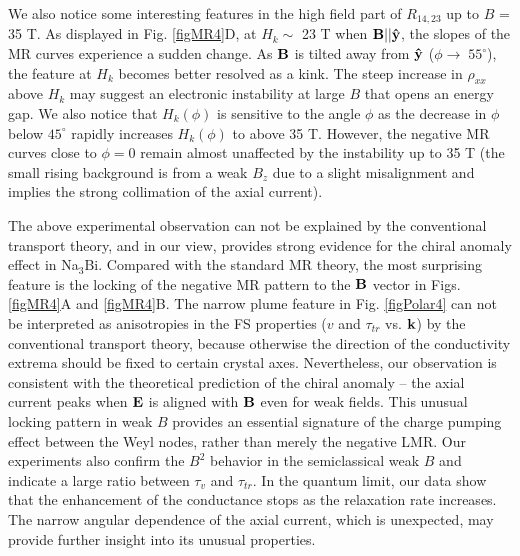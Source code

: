 We also notice some interesting features in the high field part of $R_{14,23}$ up to $B$ = 35 T. As displayed in Fig. \ref{figMR4}D, at $H_{k}\sim$ 23 T when $\bf B||\hat{y}$, the slopes of the MR curves experience a sudden change. As $\bf B$ is tilted away from $\bf\hat{y}$ ($\phi\to \; 55^\circ$), the feature at $H_k$ becomes better resolved as a kink. The steep increase in $\rho_{xx}$ above $H_k$ may suggest an electronic instability at large $B$ that opens an energy gap. We also notice that $H_k(\phi)$ is sensitive to the angle $\phi$ as the decrease in $\phi$ below $45^\circ$ rapidly increases $H_k(\phi)$ to above 35 T. However, the negative MR curves close to $\phi = 0$ remain almost unaffected by the instability up to 35 T (the small rising background is from a weak $B_z$ due to a slight misalignment and implies the strong collimation of the axial current). 

The above experimental observation can not be explained by the conventional transport theory, and in our view, provides strong evidence for the chiral anomaly effect in Na$_3$Bi. Compared with the standard MR theory, the most surprising feature is the locking of the negative MR pattern to the $\bf B$ vector in Figs. \ref{figMR4}A and \ref{figMR4}B. The narrow plume feature in Fig. \ref{figPolar4} can not be interpreted as anisotropies in the FS properties ($v$ and $\tau_{tr}$ vs. $\bf k$) by the conventional transport theory, because otherwise the direction of the conductivity extrema should be fixed to certain crystal axes. Nevertheless, our observation is consistent with the theoretical prediction of the chiral anomaly -- the axial current peaks when $\bf E$ is aligned with $\bf B$ even for weak fields. This unusual locking pattern in weak $B$ provides an essential signature of the charge pumping effect between the Weyl nodes, rather than merely the negative LMR. Our experiments also confirm the $B^2$ behavior in the semiclassical weak $B$ and indicate a large ratio between $\tau_v$ and $\tau_{tr}$. In the quantum limit, our data show that the enhancement of the conductance stops as the relaxation rate increases. The narrow angular dependence of the axial current, which is unexpected, may provide further insight into its unusual properties. 











